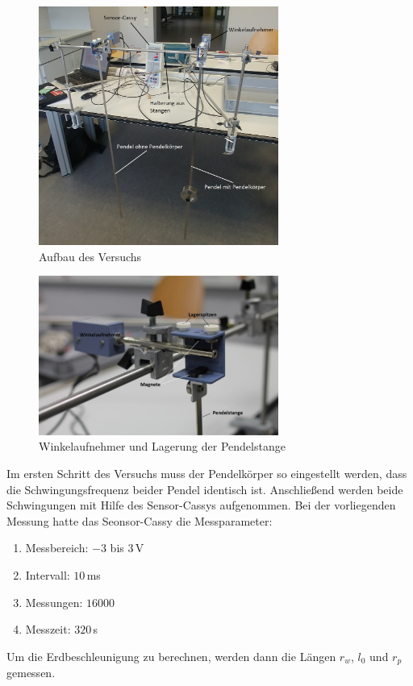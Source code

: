 \begin{figure}[H]
	\centering
	\includegraphics[width = 0.7\textwidth]{bilder/aufbaupendel1.jpg}
	\caption{Aufbau des Versuchs}\label{pic:aufbau1}
\end{figure}

\begin{figure}[H]
	\centering
	\includegraphics[width = 0.7\textwidth]{bilder/aufbaupendel2.jpg}
	\caption{Winkelaufnehmer und Lagerung der Pendelstange}\label{pic:aufbau2}
\end{figure}
Im ersten Schritt des Versuchs muss der Pendelkörper so eingestellt werden, dass die Schwingungsfrequenz beider Pendel identisch ist. Anschließend werden beide Schwingungen mit Hilfe des Sensor-Cassys aufgenommen. Bei der vorliegenden Messung hatte das Seonsor-Cassy die Messparameter:
\begin{enumerate}
\item Messbereich: $-3$ bis $3\,$V
\item Intervall: $10\,$ms
\item Messungen: $16000$
\item Messzeit: $320\,$s
\end{enumerate}
Um die Erdbeschleunigung zu berechnen, werden dann die Längen $r_w$, $l_0$ und $r_p$ gemessen.  


